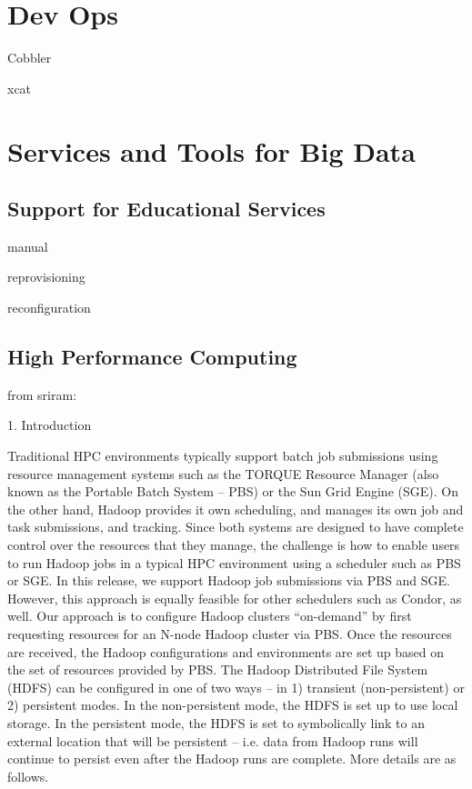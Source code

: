 \documentclass{article}
\begin{document}
\section{Dev Ops}

Cobbler

xcat



\section{Services and Tools for Big Data}

\subsection{Support for Educational Services}

manual

reprovisioning

reconfiguration

\subsection{High Performance Computing}


from sriram:

1. Introduction

Traditional HPC environments typically support batch job submissions using resource
management systems such as the TORQUE Resource Manager (also known as the
Portable Batch System – PBS) or the Sun Grid Engine (SGE). On the other hand, Hadoop
provides it own scheduling, and manages its own job and task submissions, and tracking.
Since both systems are designed to have complete control over the resources that they
manage, the challenge is how to enable users to run Hadoop jobs in a typical HPC
environment using a scheduler such as PBS or SGE. In this release, we support Hadoop
job submissions via PBS and SGE. However, this approach is equally feasible for other
schedulers such as Condor, as well.
Our approach is to configure Hadoop clusters “on-demand” by first requesting resources
for an N-node Hadoop cluster via PBS. Once the resources are received, the Hadoop
configurations and environments are set up based on the set of resources provided by
PBS. The Hadoop Distributed File System (HDFS) can be configured in one of two ways
– in 1) transient (non-persistent) or 2) persistent modes. In the non-persistent mode, the
HDFS is set up to use local storage. In the persistent mode, the HDFS is set to
symbolically link to an external location that will be persistent – i.e. data from Hadoop
runs will continue to persist even after the Hadoop runs are complete. More details are as
follows.
\end{document}
